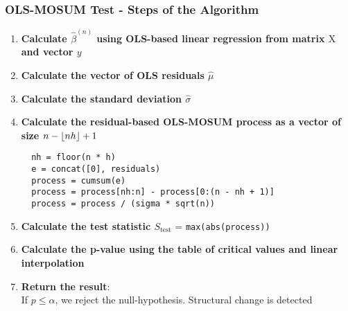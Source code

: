 \documentclass[presentation.tex]{subfiles}
\begin{document}
\begin{frame}[fragile]
  \frametitle{OLS-MOSUM Test - Steps of the Algorithm}
  \begin{enumerate}
  \item \textbf{Calculate $\hat{\beta}^{(n)}$ using OLS-based linear
    regression from matrix $\mathrm{X}$ and vector $y$}
  \item \textbf{Calculate the vector of OLS residuals $\hat{\mu}$}
  \item \textbf{Calculate the standard deviation $\hat{\sigma}$}
  \item \textbf{Calculate the residual-based OLS-MOSUM process as a vector of size $n - \lfloor nh\rfloor + 1$}
  \begin{verbatim}
  nh = floor(n * h)
  e = concat([0], residuals)
  process = cumsum(e)
  process = process[nh:n] - process[0:(n - nh + 1)]
  process = process / (sigma * sqrt(n))
  \end{verbatim}
\item \textbf{Calculate the test statistic $S_{\text{test}}$} = \texttt{max(abs(process))}
\item \textbf{Calculate the p-value using the table of critical values and linear interpolation}
\item \textbf{Return the result}: \\
  If $p \leq \alpha$, we reject the null-hypothesis. Structural change is detected
  \end{enumerate} 
\end{frame}
\end{document}

